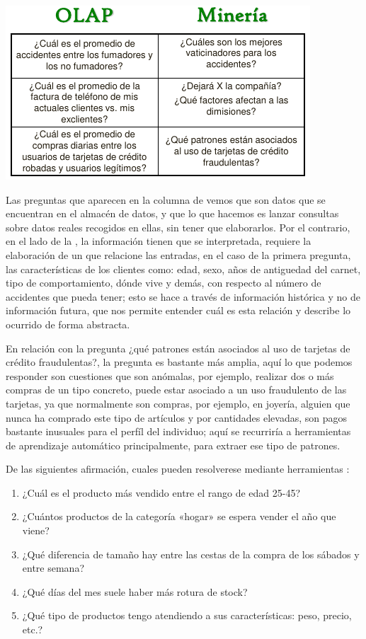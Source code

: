 \begin{center}
    \includegraphics[scale=.8]{images/mod01-13.png}
\end{center}

Las preguntas que aparecen en la columna de  vemos que son datos que se encuentran en el almacén de datos, y que lo que hacemos es lanzar consultas sobre datos reales recogidos en ellas, sin tener que elaborarlos. Por el contrario, en el lado de la , la información tienen que se interpretada, requiere la elaboración de un  que relacione las entradas, en el caso de la primera pregunta, las características de los clientes como: edad, sexo, años de antiguedad del carnet, tipo de comportamiento, dónde vive y demás, con respecto al número de accidentes que pueda tener; esto se hace a través de información histórica y no de información futura, que nos permite entender cuál es esta relación y describe lo ocurrido de forma abstracta.

En relación con la pregunta ¿qué patrones están asociados al uso de tarjetas de crédito fraudulentas?, la pregunta es bastante más amplia, aquí lo que podemos responder son cuestiones que son anómalas, por ejemplo, realizar dos o más compras de un tipo concreto, puede estar asociado a un uso fraudulento de las tarjetas, ya que normalmente son compras, por ejemplo, en joyería, alguien que nunca ha comprado este tipo de artículos y por cantidades elevadas, son pagos bastante inusuales para el perfíl del individuo; aquí se recurriría a herramientas de aprendizaje automático principalmente, para extraer ese tipo de patrones.

De las siguientes afirmación, cuales pueden resolverese mediante herramientas :

\begin{enumerate}[label=\Alph*)]
    \item ¿Cuál es el producto más vendido entre el rango de edad 25-45?
    \item ¿Cuántos productos de la categoría «hogar» se espera vender el año que viene?
    \item ¿Qué diferencia de tamaño hay entre las cestas de la compra de los sábados y entre semana?
    \item ¿Qué días del mes suele haber más rotura de stock?
    \item ¿Qué tipo de productos tengo atendiendo a sus características: peso, precio, etc.?
\end{enumerate}

